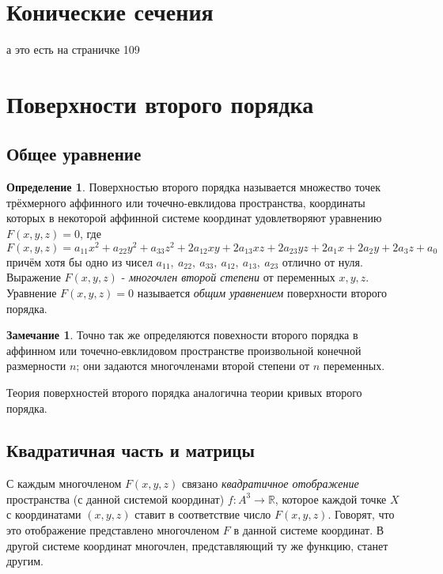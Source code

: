\documentclass[a4paper, 12pt]{article}
\theoremstyle{definition}
\newtheorem*{definition}{Определение}
\newtheorem*{remark}{Замечание}
\begin{document}
	\section{Конические сечения}
	а это есть на страничке 109

	\section{Поверхности второго порядка}
\subsection{Общее уравнение}
\begin{definition}
    Поверхностью второго порядка называется множество точек трёхмерного аффинного или точечно-евклидова пространства, координаты которых в некоторой аффинной системе координат удовлетворяют уравнению $F(x, y, z) = 0$, где
    \[ F(x, y, z) = a_{11} x^2 + a_{22} y^2 + a_{33} z^2 + 2a_{12} xy + 2a_{13} xz + 2a_{23} yz + 2a_1 x + 2a_2 y + 2a_3 z + a_0 \]
    причём хотя бы одно из чисел $a_{11}, \ a_{22}, \ a_{33}, \ a_{12}, \ a_{13}, \ a_{23}$ отлично от нуля. Выражение $F(x, y, z)$ - \textit{многочлен второй степени} от переменных $x, y, z$.
    Уравнение $F(x, y, z) = 0$ называется \textit{общим уравнением} поверхности второго порядка.
\end{definition}

\begin{remark}
    Точно так же определяются повехности второго порядка в аффинном или точечно-евклидовом пространстве произвольной конечной размерности $n$;
    они задаются многочленами второй степени от $n$ переменных.
\end{remark}

Теория поверхностей второго порядка аналогична теории кривых второго порядка.


\subsection{Квадратичная часть и матрицы}
С каждым многочленом $F(x,y,z)$ связано \textit{квадратичное отображение} пространства (с данной системой координат) $f: A^3 \to \mathbb{R}$, которое каждой точке $X$ с координатами $(x, y, z)$ ставит в соответствие число $F(x,y,z)$.
Говорят, что это отображение представлено многочленом $F$ в данной системе координат.
В другой системе координат многочлен, представляющий ту же функцию, станет другим.
\end{document}

